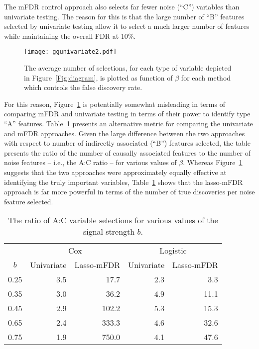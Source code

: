 The mFDR control approach also selects far fewer noise (``C'') variables than univariate testing.  The reason for this is that the large number of ``B'' features selected by univariate testing allow it to select a much larger number of features while maintaining the overall FDR at 10\%.

\begin{figure} [!htb]
 \centering
  \texttt{[image: ggunivariate2.pdf]}
  \caption{\label{Fig:univariate} The average number of selections, for each type of variable depicted in Figure~\ref{Fig:diagram}, is plotted as function of $\beta$ for each method which controls the false discovery rate.}
\end{figure}

For this reason, Figure~\ref{Fig:univariate} is potentially somewhat misleading in terms of comparing mFDR and univariate testing in terms of their power to identify type ``A'' features.
Table~\ref{Tab:univariate} presents an alternative metric for comparing the univariate and mFDR approaches.  Given the large difference between the two approaches with respect to number of indirectly associated (``B'') features selected, the table presents the ratio of the number of causally associated features to the number of noise features -- i.e., the A:C ratio -- for various values of $\beta$.  Whereas Figure~\ref{Fig:univariate} suggests that the two approaches were approximately equally effective at identifying the truly important variables, Table~\ref{Tab:univariate} shows that the lasso-mFDR approach is far more powerful in terms of the number of true discoveries per noise feature selected.

\begin{table}[ht!]
\centering
\begin{tabular}{c | r r r r}
  \hline
  & \multicolumn{2}{c}{Cox} & \multicolumn{2}{c}{Logistic}\\
 $b$ & Univariate & Lasso-mFDR & Univariate & Lasso-mFDR \\ 
  \hline
  0.25 & 3.5 & 17.7 & 2.3 & 3.3 \\ 
  0.35 & 3.0 & 36.2 & 4.9 & 11.1 \\ 
  0.45 & 2.9 & 102.2 & 5.3 & 15.3 \\ 
  0.65 & 2.4 & 333.3 & 4.6 & 32.6 \\ 
  0.75 & 1.9 & 750.0 & 4.1 & 47.6 \\ 
   \hline
\end{tabular}
\caption{\label{Tab:univariate} The ratio of A:C variable selections for various values of the signal strength $b$.}
\end{table}

